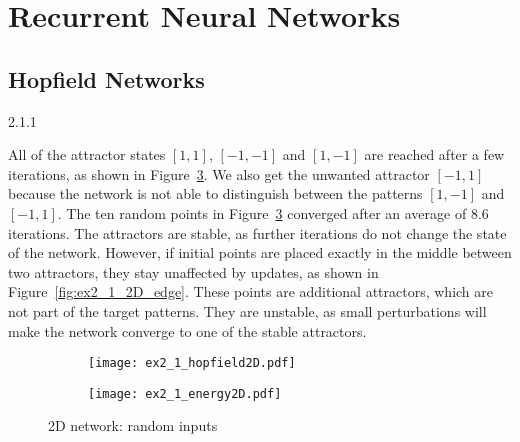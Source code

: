 
\section{Recurrent Neural Networks}
\label{ex:2}


\subsection{Hopfield Networks}
\label{ex:2.1}


\begin{task}{2.1.1}
\end{task}

All of the attractor states $[1, 1]$, $[-1, -1]$ and $[1, -1]$ are reached after a few iterations,
as shown in Figure~\ref{fig:ex2_1_2D_random}. We also get the unwanted attractor $[-1, 1]$ because
the network is not able to distinguish between the patterns $[1, -1]$ and $[-1, 1]$. The ten random
points in Figure~\ref{fig:ex2_1_2D_random} converged after an average of $8.6$ iterations. The
attractors are stable, as further iterations do not change the state of the network. However, if
initial points are placed exactly in the middle between two attractors, they stay unaffected by
updates, as shown in Figure~\ref{fig:ex2_1_2D_edge}. These points are additional attractors, which
are not part of the target patterns. They are unstable, as small perturbations will make the network
converge to one of the stable attractors.

\begin{figure}[ht!]
  \centering
  \begin{subfigure}{0.49\textwidth}
    \texttt{[image: ex2\_1\_hopfield2D.pdf]}
    \label{fig:ex2_1_hopfield2D}
  \end{subfigure}
  \begin{subfigure}{0.49\textwidth}
    \texttt{[image: ex2\_1\_energy2D.pdf]}
    \label{fig:ex2_1_energy2D}
  \end{subfigure}
  \caption{2D network: random inputs}
  \label{fig:ex2_1_2D_random}
\end{figure}

